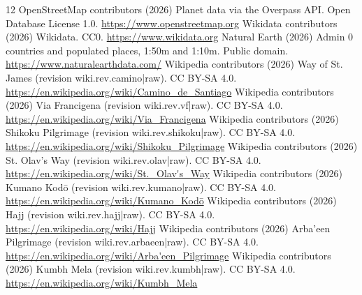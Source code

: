 \documentclass[11pt,a4paper]{article}
\begin{document}
\begin{thebibliography}{12}
 OpenStreetMap contributors (2026) Planet data via the Overpass API. Open Database License 1.0. \url{https://www.openstreetmap.org}
 Wikidata contributors (2026) Wikidata. CC0. \url{https://www.wikidata.org}
 Natural Earth (2026) Admin 0 countries and populated places, 1:50m and 1:10m. Public domain. \url{https://www.naturalearthdata.com/}
 Wikipedia contributors (2026) Way of St. James (revision {{wiki.rev.camino|raw}}). CC BY-SA 4.0. \url{https://en.wikipedia.org/wiki/Camino_de_Santiago}
 Wikipedia contributors (2026) Via Francigena (revision {{wiki.rev.vf|raw}}). CC BY-SA 4.0. \url{https://en.wikipedia.org/wiki/Via_Francigena}
 Wikipedia contributors (2026) Shikoku Pilgrimage (revision {{wiki.rev.shikoku|raw}}). CC BY-SA 4.0. \url{https://en.wikipedia.org/wiki/Shikoku_Pilgrimage}
 Wikipedia contributors (2026) St. Olav's Way (revision {{wiki.rev.olav|raw}}). CC BY-SA 4.0. \url{https://en.wikipedia.org/wiki/St._Olav's_Way}
 Wikipedia contributors (2026) Kumano Kodō (revision {{wiki.rev.kumano|raw}}). CC BY-SA 4.0. \url{https://en.wikipedia.org/wiki/Kumano_Kodō}
 Wikipedia contributors (2026) Hajj (revision {{wiki.rev.hajj|raw}}). CC BY-SA 4.0. \url{https://en.wikipedia.org/wiki/Hajj}
 Wikipedia contributors (2026) Arba'een Pilgrimage (revision {{wiki.rev.arbaeen|raw}}). CC BY-SA 4.0. \url{https://en.wikipedia.org/wiki/Arba'een_Pilgrimage}
 Wikipedia contributors (2026) Kumbh Mela (revision {{wiki.rev.kumbh|raw}}). CC BY-SA 4.0. \url{https://en.wikipedia.org/wiki/Kumbh_Mela}
\end{thebibliography}
\end{document}
